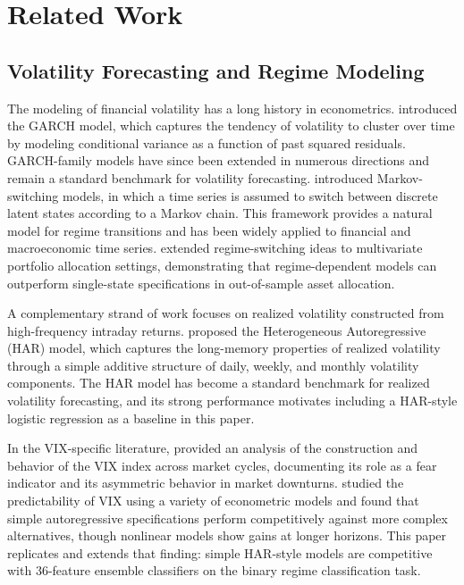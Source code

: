 \documentclass[12pt]{article}
\begin{document}
\section{Related Work}
\label{sec:related}

\subsection{Volatility Forecasting and Regime Modeling}

The modeling of financial volatility has a long history in econometrics. \citet{bollerslev1986} introduced the GARCH model, which captures the tendency of volatility to cluster over time by modeling conditional variance as a function of past squared residuals. GARCH-family models have since been extended in numerous directions and remain a standard benchmark for volatility forecasting. \citet{hamilton1989} introduced Markov-switching models, in which a time series is assumed to switch between discrete latent states according to a Markov chain. This framework provides a natural model for regime transitions and has been widely applied to financial and macroeconomic time series. \citet{guidolin2007} extended regime-switching ideas to multivariate portfolio allocation settings, demonstrating that regime-dependent models can outperform single-state specifications in out-of-sample asset allocation.

A complementary strand of work focuses on realized volatility constructed from high-frequency intraday returns. \citet{corsi2009} proposed the Heterogeneous Autoregressive (HAR) model, which captures the long-memory properties of realized volatility through a simple additive structure of daily, weekly, and monthly volatility components. The HAR model has become a standard benchmark for realized volatility forecasting, and its strong performance motivates including a HAR-style logistic regression as a baseline in this paper.

In the VIX-specific literature, \citet{whaley2009} provided an analysis of the construction and behavior of the VIX index across market cycles, documenting its role as a fear indicator and its asymmetric behavior in market downturns. \citet{fernandes2014} studied the predictability of VIX using a variety of econometric models and found that simple autoregressive specifications perform competitively against more complex alternatives, though nonlinear models show gains at longer horizons. This paper replicates and extends that finding: simple HAR-style models are competitive with 36-feature ensemble classifiers on the binary regime classification task.
\end{document}
